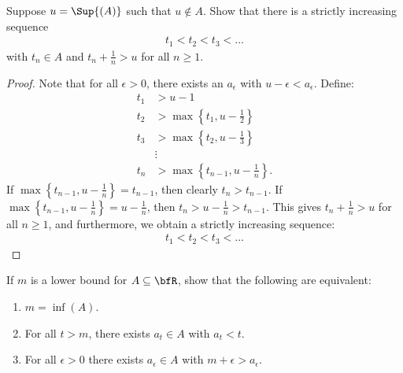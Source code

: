 \documentclass[10pt,twoside,openany]{memoir}
\begin{document}
    \begin{exercise}
        Suppose $u = \Sup{(A)}$ such that $u \not\in A$. Show that there is a strictly increasing sequence
            \begin{equation*}
            \begin{split}
                t_1 < t_2 < t_3 < ...
            \end{split}
            \end{equation*}
        with $t_n \in A$ and $t_n + \frac{1}{n} > u$ for all $n \geq 1$.
    \end{exercise}  
        \begin{proof}
            Note that for all $\epsilon > 0$, there exists an $a_\epsilon$ with $u - \epsilon < a_\epsilon$. Define:
                \begin{equation*}
                \begin{split}
                    t_1 &> u - 1 \\
                    t_2 &> \max \left\{t_1, u - \frac{1}{2}\right\} \\
                    t_3 &> \max \left\{t_2, u - \frac{1}{3}\right\} \\
                    &\vdots \\
                    t_n &> \max \left\{t_{n-1}, u - \frac{1}{n} \right\}.
                \end{split}
                \end{equation*}
            If $\max \left\{t_{n-1}, u - \frac{1}{n} \right\} = t_{n-1}$, then clearly $t_n > t_{n-1}$. If $\max \left\{t_{n-1}, u - \frac{1}{n} \right\} = u - \frac{1}{n}$, then $t_n > u - \frac{1}{n} > t_{n-1}$. This gives $t_n + \frac{1}{n} > u$ for all $n \geq 1$, and furthermore, we obtain a strictly increasing sequence:
                \begin{equation*}
                \begin{split}
                    t_1 < t_2 < t_3 < ... 
                \end{split}
                \end{equation*}
                \qedhere
        \end{proof}
    \begin{exercise}
        If $m$ is a lower bound for $A \subseteq \bfR$, show that the following are equivalent:
            \begin{enumerate}[label = (\arabic*)]
                \item $m = \inf{(A)}$.
                \item For all $t>m$, there exists $a_t \in A$ with $a_t <  t$.
                \item For all $\epsilon > 0$ there exists $a_\epsilon \in A$ with $m+\epsilon > a_\epsilon$.
            \end{enumerate}
    \end{exercise}
\end{document}
